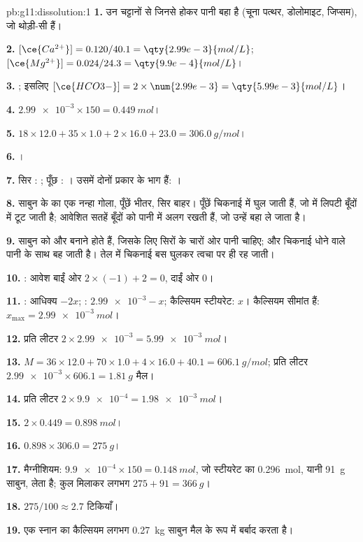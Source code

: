 \begin{solution}{pb:g11:dissolution:1}
\textbf{1.} उन चट्टानों से जिनसे होकर पानी बहा है (चूना पत्थर,
डोलोमाइट, जिप्सम), जो थोड़ी-सी  हैं।

\textbf{2.} $[\ce{Ca^{2+}}] = 0.120 / 40.1 = \qty{2.99e-3}{mol/L}$;
$[\ce{Mg^{2+}}] = 0.024 / 24.3 = \qty{9.9e-4}{mol/L}$।

\textbf{3.} ; इसलिए
$[\ce{HCO3-}] = 2 \times \num{2.99e-3} = \qty{5.99e-3}{mol/L}$।

\textbf{4.} $\num{2.99e-3} \times 150 = \qty{0.449}{mol}$।

\textbf{5.} $18 \times 12.0 + 35 \times 1.0 + 2 \times 16.0 + 23.0 =
\qty{306.0}{g/mol}$।

\textbf{6.} ।

\textbf{7.} सिर : ; पूँछ :
। उसमें दोनों प्रकार के भाग हैं: ।

\textbf{8.} साबुन के  का एक नन्हा गोला, पूँछें भीतर, सिर बाहर।
पूँछें चिकनाई में घुल जाती हैं, जो  में लिपटी बूँदों में टूट जाती
है; आवेशित सतहें बूँदों को पानी में अलग रखती हैं,
जो उन्हें बहा ले जाता है।

\textbf{9.} साबुन को  और  बनाने होते हैं, जिसके लिए सिरों के चारों ओर पानी
चाहिए; और चिकनाई धोने वाले पानी के साथ बह जाती है। तेल में चिकनाई
बस घुलकर त्वचा पर ही रह जाती।

\textbf{10.} : आवेश बाईं ओर
$2 \times (-1) + 2 = 0$, दाईं ओर $0$।

\textbf{11.} : आधिक्य $- 2x$; :
$\num{2.99e-3} - x$; कैल्सियम स्टीयरेट: $x$। कैल्सियम 
सीमांत हैं: $x_{\max} = \qty{2.99e-3}{mol}$।

\textbf{12.} प्रति लीटर $2 \times \num{2.99e-3} = \qty{5.99e-3}{mol}$।

\textbf{13.} $M = 36 \times 12.0 + 70 \times 1.0 + 4 \times 16.0 + 40.1 =
\qty{606.1}{g/mol}$; प्रति लीटर $\num{2.99e-3} \times 606.1 = \qty{1.81}{g}$
मैल।

\textbf{14.} प्रति लीटर $2 \times \num{9.9e-4} = \qty{1.98e-3}{mol}$।

\textbf{15.} $2 \times 0.449 = \qty{0.898}{mol}$।

\textbf{16.} $0.898 \times 306.0 = \qty{275}{g}$।

\textbf{17.} मैग्नीशियम: $\num{9.9e-4} \times 150 = \qty{0.148}{mol}$,
जो स्टीयरेट का \qty{0.296}{mol}, यानी \qty{91}{g} साबुन, लेता है; कुल मिलाकर
लगभग $275 + 91 = \qty{366}{g}$।

\textbf{18.} $275 / 100 \approx 2.7$ टिकियाँ।

\textbf{19.} एक स्नान का कैल्सियम लगभग \qty{0.27}{kg} साबुन मैल के रूप में
बर्बाद करता है।
\end{solution}
